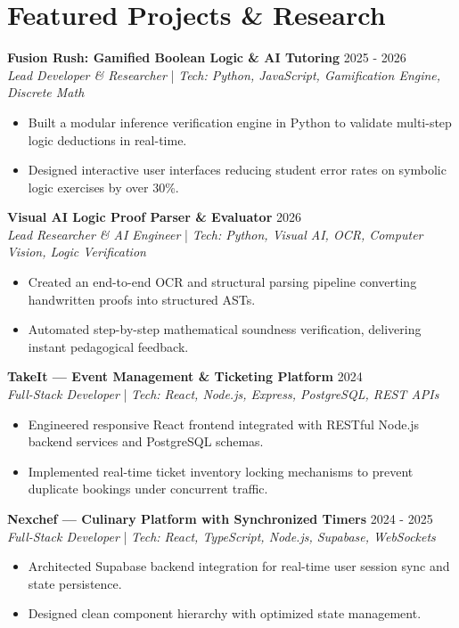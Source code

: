 \documentclass[letterpaper,10pt]{article}
\begin{document}
\section{Featured Projects \& Research}
\textbf{Fusion Rush: Gamified Boolean Logic \& AI Tutoring} \hfill 2025 - 2026
\\ \textit{Lead Developer \& Researcher} | \textit{Tech: Python, JavaScript, Gamification Engine, Discrete Math}
\begin{itemize}
  \item Built a modular inference verification engine in Python to validate multi-step logic deductions in real-time.
  \item Designed interactive user interfaces reducing student error rates on symbolic logic exercises by over 30\%.
\end{itemize}
\vspace{4pt}
\textbf{Visual AI Logic Proof Parser \& Evaluator} \hfill 2026
\\ \textit{Lead Researcher \& AI Engineer} | \textit{Tech: Python, Visual AI, OCR, Computer Vision, Logic Verification}
\begin{itemize}
  \item Created an end-to-end OCR and structural parsing pipeline converting handwritten proofs into structured ASTs.
  \item Automated step-by-step mathematical soundness verification, delivering instant pedagogical feedback.
\end{itemize}
\vspace{4pt}
\textbf{TakeIt — Event Management \& Ticketing Platform} \hfill 2024
\\ \textit{Full-Stack Developer} | \textit{Tech: React, Node.js, Express, PostgreSQL, REST APIs}
\begin{itemize}
  \item Engineered responsive React frontend integrated with RESTful Node.js backend services and PostgreSQL schemas.
  \item Implemented real-time ticket inventory locking mechanisms to prevent duplicate bookings under concurrent traffic.
\end{itemize}
\vspace{4pt}
\textbf{Nexchef — Culinary Platform with Synchronized Timers} \hfill 2024 - 2025
\\ \textit{Full-Stack Developer} | \textit{Tech: React, TypeScript, Node.js, Supabase, WebSockets}
\begin{itemize}
  \item Architected Supabase backend integration for real-time user session sync and state persistence.
  \item Designed clean component hierarchy with optimized state management.
\end{itemize}
\end{document}
